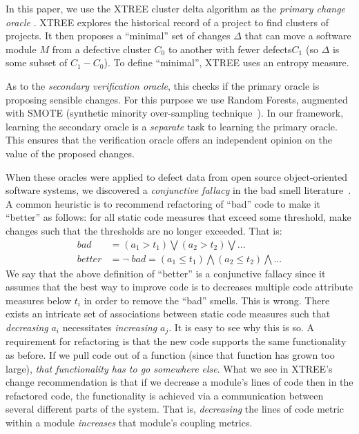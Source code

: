 \documentclass[twocolumn,5p]{elsarticle}
\theoremstyle{break}
\begin{document}
In this paper, we use 
the XTREE cluster delta algorithm as the {\em primary change  oracle} .
XTREE 
explores the historical record of a project to find clusters of projects.
It then proposes a ``minimal'' set of changes $\Delta$ that can move a software module $M$ from a defective cluster $C_0$ to another with fewer defects$C_1$ (so $\Delta$
is some subset of $C_1 - C_0$). To define ``minimal'', XTREE uses an entropy measure.

As to 
the {\em secondary verification oracle}, this  checks if the primary oracle is proposing
sensible changes. For this purpose we use Random Forests\cite{breiman2001random}, augmented with SMOTE (synthetic  minority over-sampling technique~\cite{chawla2002smote}).
 In our framework,  learning
the secondary oracle is   a {\em separate} task to learning the primary
oracle. This  ensures that the verification oracle offers an independent
opinion on the value of the proposed changes.

When these oracles were applied to defect data from
open source object-oriented software systems, we discovered a {\em conjunctive fallacy}
in the bad smell literature~\cite{erni96,bender99,Shatnawi10,Alves2010,hermans15}.
A common heuristic is to recommend refactoring of ``bad'' code
to make it ``better''   as follows: for all static code measures that exceed some threshold, make changes such that the thresholds are no longer exceeded. That is:
\begin{equation}\label{eq:df}
\scriptstyle
\begin{array}{rl}
\mathit{bad} & = \left(a_1 > t_1 \right) \bigvee \left(a_2 > t_2\right) \bigvee    ... \\
\mathit{better} & = \neg\;\mathit{bad} = \left(a_1 \le t_1 \right) \bigwedge \left(a_2 \le t_2\right)  \bigwedge  ...
\end{array}
\end{equation}
We say that the above definition of ``better'' is a conjunctive fallacy
since it assumes that the best way to improve code is to decreases multiple code attribute measures below $t_i$ in order
to remove the ``bad'' smells. This is wrong.  
There exists an intricate set of associations between static code measures
such that {\em decreasing}  $a_i$ necessitates {\em increasing} $a_j$.
It is easy to see why this is so.
A requirement for  refactoring is that the new code supports the same functionality
as before. If we pull code out of a function (since that function has grown too
large), {\em that functionality has to go somewhere else}. What we see in XTREE's change
recommendation is that if we decrease a module's lines of code  then in the refactored
code, the functionality is achieved via a communication between several different parts
of the system. That is, {\em decreasing} the lines of code metric within a module {\em increases}
that module's coupling metrics.
\end{document}
